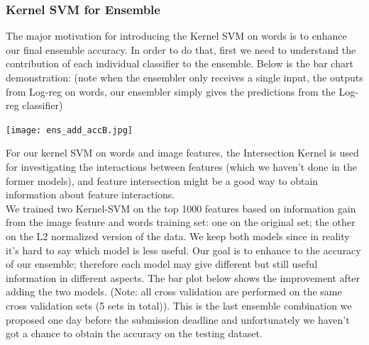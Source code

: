 \subsubsection{Kernel SVM for Ensemble}
The major motivation for introducing the Kernel SVM on words is to enhance our final ensemble accuracy. In order to do that, first we need to understand the contribution of each individual classifier to the ensemble. Below is the bar chart demonstration: (note when the ensembler only receives a single input, the outputs from Log-reg on words, our ensembler simply gives the predictions from the Log-reg classifier)\\
 \begin{center}
 \texttt{[image: ens\_add\_accB.jpg]}
     \end{center}
For our kernel SVM on words and image features, the Intersection Kernel is used for investigating the interactions between features (which we haven't done in the former models), and feature intersection might be a good way to obtain information about feature interactions.\\
We trained two Kernel-SVM on the top 1000  features based on information gain from the image feature and words training set: one on the original set; the other on the L2 normalized version of the data. We keep both models since in reality it's hard to say which model is less useful. Our goal is to enhance to the accuracy of our ensemble; therefore each model may give different but still useful information in different aspects. The bar plot below shows the improvement after adding the two models. (Note: all cross validation are performed on the same cross validation sets (5 sets in total)). This is the last ensemble combination we proposed one day before the submission deadline and unfortunately we haven't got a chance to obtain the accuracy on the testing dataset.\\

